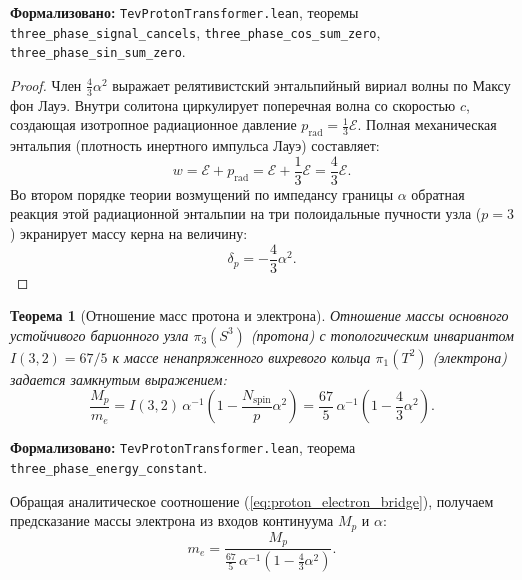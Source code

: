\documentclass[11pt,a4paper]{article}
\newtheorem{theorem}{Теорема}
\theoremstyle{definition}
\theoremstyle{remark}
\begin{document}
\noindent\small\textbf{Формализовано:} \texttt{TevProtonTransformer.lean}, теоремы \texttt{three_phase_signal_cancels}, \texttt{three_phase_cos_sum_zero}, \texttt{three_phase_sin_sum_zero}.

\begin{proof}
Член $\frac{4}{3}\alpha^2$ выражает релятивистский энтальпийный вириал волны по Максу фон Лауэ. Внутри солитона циркулирует поперечная волна со скоростью $c$, создающая изотропное радиационное давление $p_{\mathrm{rad}} = \frac{1}{3}\mathcal{E}$. Полная механическая энтальпия (плотность инертного импульса Лауэ) составляет:
\begin{equation}
    w = \mathcal{E} + p_{\mathrm{rad}} = \mathcal{E} + \frac{1}{3}\mathcal{E} = \frac{4}{3}\mathcal{E}.
    \label{eq:laue_enthalpy_exact}
\end{equation}
Во втором порядке теории возмущений по импедансу границы $\alpha$ обратная реакция этой радиационной энтальпии на три полоидальные пучности узла ($p=3$) экранирует массу керна на величину:
\begin{equation}
    \delta_p = -\frac{4}{3} \alpha^2.
\end{equation}
\end{proof}
	
\begin{theorem}[Отношение масс протона и электрона]
	\label{thm:proton_electron_mass_ratio}
Отношение массы основного устойчивого барионного узла $\pi_3(S^3)$ (протона) с топологическим инвариантом $I(3,2) = 67/5$ к массе ненапряженного вихревого кольца $\pi_1(T^2)$ (электрона) задается замкнутым выражением:
\begin{equation}
	\frac{M_p}{m_e} = I(3, 2) \, \alpha^{-1} \left( 1 - \frac{N_{\mathrm{spin}}}{p}\alpha^2 \right) = \frac{67}{5} \, \alpha^{-1} \left( 1 - \frac{4}{3}\alpha^2 \right).
	\label{eq:proton_electron_bridge}
\end{equation}
\end{theorem}

\noindent\small\textbf{Формализовано:} \texttt{TevProtonTransformer.lean}, теорема \texttt{three_phase_energy_constant}.
	
Обращая аналитическое соотношение (\ref{eq:proton_electron_bridge}), получаем предсказание массы электрона из входов континуума $M_p$ и $\alpha$:
\begin{equation}
	m_e = \frac{M_p}{\frac{67}{5} \, \alpha^{-1} \left( 1 - \frac{4}{3}\alpha^2 \right)}.
	\label{eq:electron_mass_predicted}
\end{equation}
	
\end{document}
